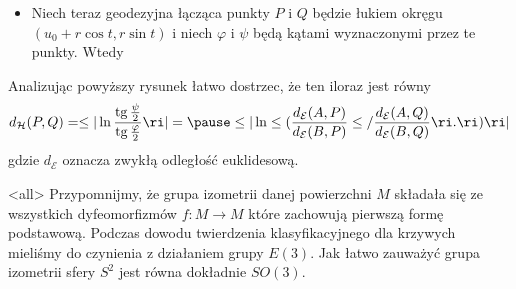 \begin{frame}

\begin{itemize}

\item Niech teraz geodezyjna łącząca punkty $P$ i $Q$ będzie łukiem okręgu $(u_0+r\cos t,r\sin t)$ i niech $\varphi$ i $\psi$ będą kątami wyznaczonymi przez te punkty. \pause Wtedy

\end{itemize}

\end{frame}
\begin{frame}
\begin{center}

\end{center}
Analizując powyższy rysunek łatwo dostrzec, że ten iloraz jest równy
\[d_{\mathcal{H}}(P,Q)=\le|\ln \frac{\operatorname{tg} \frac{\psi}{2}}{\operatorname{tg} \frac{\varphi}{2}}\ri|=\pause\le|\ln \le(\frac{d_{\mathcal{E}}(A,P)}{d_{\mathcal{E}}(B,P)}\le/\frac{d_{\mathcal{E}}(A,Q)}{d_{\mathcal{E}}(B,Q)}\ri.\ri)\ri|\]
gdzie $d_{\mathcal{E}}$ oznacza zwykłą odległość euklidesową.
\end{frame}
\mode<all>{}
Przypomnijmy, że grupa izometrii danej powierzchni $M$ składała się ze wszystkich dyfeomorfizmów $f\colon M\to M$ które zachowują pierwszą formę podstawową. Podczas dowodu twierdzenia klasyfikacyjnego dla krzywych mieliśmy do czynienia z działaniem grupy $E(3)$. Jak łatwo zauważyć grupa izometrii sfery $S^2$ jest równa dokładnie $SO(3)$. 
